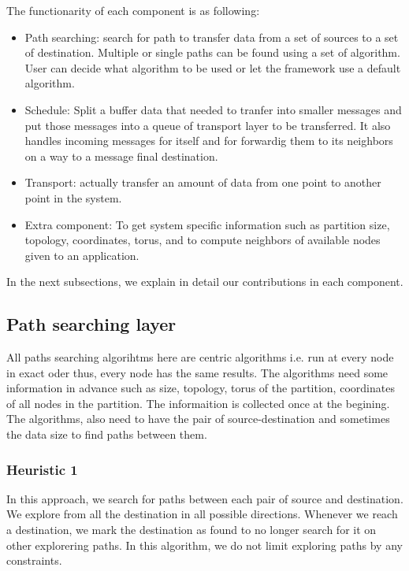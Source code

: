 The functionarity of each component is as following:
\begin{itemize}
\item Path searching: search for path to transfer data from a set of sources to a set of destination. Multiple or single paths can be found using a set of algorithm. User can decide what algorithm to be used or let the framework use a default algorithm.
\item Schedule: Split a buffer data that needed to tranfer into smaller messages and put those messages into a queue of transport layer to be transferred. It also handles incoming messages for itself and for forwardig them to its neighbors on a way to a message final destination.
\item Transport: actually transfer an amount of data from one point to another point in the system.
\item Extra component: To get system specific information such as partition size, topology, coordinates, torus, and to compute neighbors of available nodes given to an application.
\end{itemize}

In the next subsections, we explain in detail our contributions in each component.

\subsection{Path searching layer}
All paths searching algorihtms here are centric algorithms i.e. run at every node in exact oder thus, every node has the same results. The algorithms need some information in advance such as size, topology, torus of the partition, coordinates of all nodes in the partition. The informaition is collected once at the begining. The algorithms, also need to have the pair of source-destination and sometimes the data size to find paths between them.

\subsubsection{Heuristic 1}
In this approach, we search for paths between each pair of source and destination. We explore from all the destination in all possible directions. Whenever we reach a destination, we mark the destination as found to no longer search for it on other explorering paths. In this algorithm, we do not limit exploring paths by any constraints.

